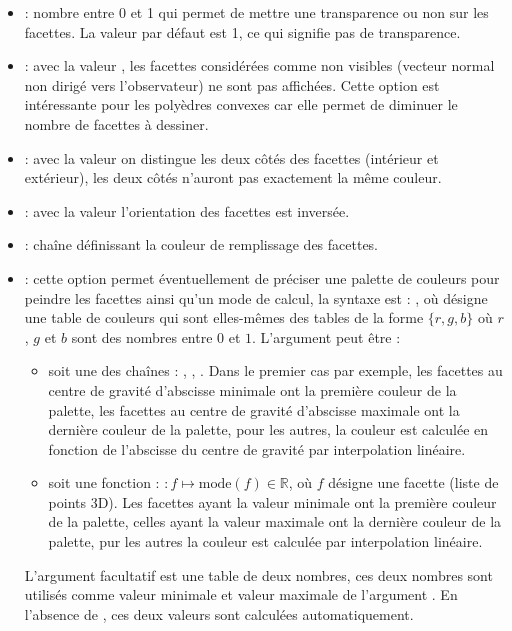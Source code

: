 \begin{itemize}
        \item {} : nombre entre 0 et 1 qui permet de mettre une transparence ou non sur les facettes. La valeur par défaut est 1, ce qui signifie pas de transparence.
        \item {} : avec la valeur \true, les facettes considérées comme non visibles (vecteur normal non dirigé vers l'observateur) ne sont pas affichées. Cette option est intéressante pour les polyèdres convexes car elle permet de diminuer le nombre de facettes à dessiner.
        \item {} : avec la valeur \true on distingue les deux côtés des facettes (intérieur et extérieur), les deux côtés n'auront pas exactement la même couleur.
        
        \item {} : avec la valeur \true l'orientation des facettes est inversée.
        
        \item {} : chaîne définissant la couleur de remplissage des facettes.
        \item {} : cette option permet éventuellement de préciser une palette de couleurs pour peindre les facettes ainsi qu'un mode de calcul, la syntaxe est : , où  désigne une table de couleurs qui sont elles-mêmes des tables de la forme $\{r,g,b\}$ où $r$, $g$ et $b$ sont des nombres entre $0$ et $1$. L'argument   peut être :
            \begin{itemize}
                \item soit une des chaînes : , , . Dans le premier cas par exemple, les facettes au centre de gravité d'abscisse minimale ont la première couleur de la palette, les facettes au centre de gravité d'abscisse maximale ont la dernière couleur de la palette, pour les autres, la couleur est calculée en fonction de l'abscisse du centre de gravité par interpolation linéaire.
                \item soit une fonction : $\colon f \mapsto \mathrm{mode}(f)\in\mathbb R$, où $f$ désigne une facette (liste de points 3D). Les facettes ayant la valeur minimale ont la première couleur de la palette, celles ayant la valeur maximale ont la dernière couleur de la palette, pur les autres la couleur est calculée par interpolation linéaire.
            \end{itemize}
            L'argument facultatif  est une table de deux nombres, ces deux nombres sont utilisés comme valeur minimale et valeur maximale de l'argument . En l'absence de , ces deux valeurs sont calculées automatiquement.
\end{itemize}

